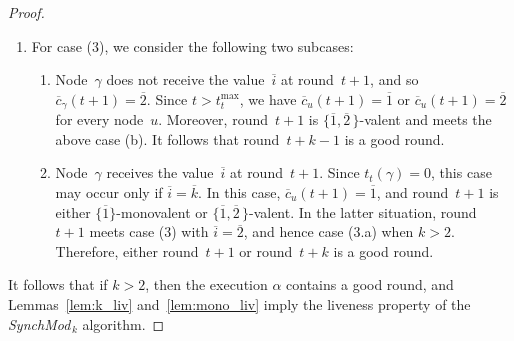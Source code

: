 \documentclass{article}
\newcommand{\cent}{\gamma}
\newcommand{\try}{t_{t}}
\newcommand{\SM}{{\em SynchMod}$_{\,k}$ }
\begin{document}
\begin{proof}
\begin{enumerate}
\item For case (3),  we consider the following two subcases:
\begin{enumerate}
\item Node~$\cent$ does not receive the value~$ \overline{i} $ at round~$t+1$, and so $ \overline{c}_{\cent}(t + 1)  = \overline{ 2 } $.
Since  $t> \try^{\max} $, we have $  \overline{c}_{u}(t + 1)  = \overline{ 1 } $ or $  \overline{c}_{u}(t + 1)  = \overline{ 2 } $ 
	for every node~$u$.
Moreover, round~$t+1$ is $ \{\overline{1} , \overline{2} \, \}$-valent and meets the above case (b).
It follows that round~$t +k-1$ is a good round.
\item Node~$\cent$ receives the value~$ \overline{i} $ at round~$t+1$.
Since $\try(\cent)= 0$, this case may occur only if $ \overline{i } = \overline{ k }$.
In this case, $  \overline{c}_{u}(t + 1)  = \overline{ 1 } $, and round~$t+1$ is either 
	$ \{\overline{1}\}$-monovalent or  $ \{\overline{1} , \overline{2} \, \}$-valent.
In the latter situation,  round~$t+1$ meets case (3) with $\overline{i}  =\overline{2} $, and hence case (3.a) when  $k>2$.
Therefore, either round~$t+1$ or round~$t+k$ is a good round.
\end{enumerate}
\end{enumerate}
It follows that if $k>2$, then the execution $\alpha$ contains a good round, and
	Lemmas~\ref{lem:k_liv} and~\ref{lem:mono_liv} imply the liveness property of the \SM algorithm.
\end{proof}

\printbibliography
\end{document}
